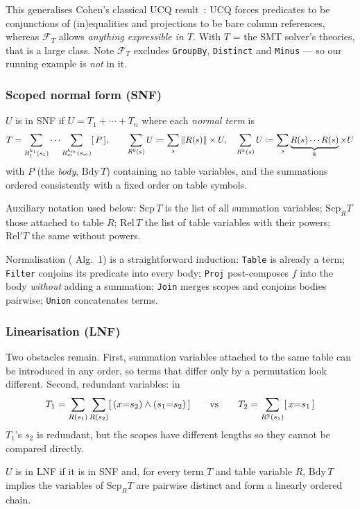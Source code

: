This generalises Cohen's classical UCQ result~\cite{cohen}: UCQ forces predicates to be
conjunctions of (in)equalities and projections to be bare column references, whereas
$\mathcal F_T$ allows \emph{anything expressible in $T$}. With $T$ = the SMT solver's
theories, that is a large class. Note $\mathcal F_T$ excludes \texttt{GroupBy},
\texttt{Distinct} and \texttt{Minus} --- so our running example is \emph{not} in it.

\subsubsection{Scoped normal form (SNF)}
\begin{definition}
$U$ is in SNF if $U=T_1+\cdots+T_n$ where each \emph{normal term} is
\[
T=\sum_{R_1^{k_1}(s_1)}\cdots\sum_{R_m^{k_m}(s_m)} [\,P\,],
\qquad
\sum_{R^0(s)}U \coloneqq \sum_{s}\left\lVert R(s) \right\rVert\times U,\quad
\sum_{R^k(s)}U \coloneqq \sum_{s}\underbrace{R(s)\cdots R(s)}_{k}\times U
\]
with $P$ (the \emph{body}, $\mathrm{Bdy}\,T$) containing no table variables, and the
summations ordered consistently with a fixed order on table symbols.
\end{definition}
Auxiliary notation used below: $\mathrm{Scp}\,T$ is the list of all summation variables;
$\mathrm{Scp}_R T$ those attached to table $R$; $\mathrm{Rel}\,T$ the list of table
variables with their powers; $\mathrm{Rel}'T$ the same without powers.

\noindent Normalisation (\cite{qed} Alg.\ 1) is a straightforward induction:
\texttt{Table} is already a term; \texttt{Filter} conjoins its predicate into every body;
\texttt{Proj} post-composes $f$ into the body \emph{without} adding a summation;
\texttt{Join} merges scopes and conjoins bodies pairwise; \texttt{Union} concatenates terms.

\subsubsection{Linearisation (LNF)}
Two obstacles remain. First, summation variables attached to the same table can be
introduced in any order, so terms that differ only by a permutation look different.
Second, redundant variables: in
\[
T_1=\sum_{R(s_1)}\sum_{R(s_2)}[\,(x{=}s_2)\wedge(s_1{=}s_2)\,]
\qquad\text{vs}\qquad
T_2=\sum_{R^2(s_1)}[\,x{=}s_1\,]
\]
$T_1$'s $s_2$ is redundant, but the scopes have different lengths so they cannot be
compared directly.

\begin{definition}
$U$ is in LNF if it is in SNF and, for every term $T$ and table variable $R$, $\mathrm{Bdy}\,T$
implies the variables of $\mathrm{Scp}_R T$ are pairwise distinct and form a linearly
ordered chain.
\end{definition}

